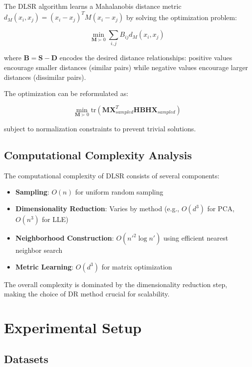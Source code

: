 \documentclass[review]{elsarticle}
\begin{document}
The DLSR algorithm learns a Mahalanobis distance metric $d_M(x_i, x_j) = (x_i - x_j)^T M (x_i - x_j)$ by solving the optimization problem:

\begin{equation}
\min_{\mathbf{M} \succ 0} \sum_{i,j} B_{ij} d_M(x_i, x_j)
\end{equation}

where $\mathbf{B} = \mathbf{S} - \mathbf{D}$ encodes the desired distance relationships: positive values encourage smaller distances (similar pairs) while negative values encourage larger distances (dissimilar pairs).

The optimization can be reformulated as:

\begin{equation}
\min_{\mathbf{M} \succ 0} \text{tr}(\mathbf{M} \mathbf{X}_{sampled}^T \mathbf{H} \mathbf{B} \mathbf{H} \mathbf{X}_{sampled})
\end{equation}

subject to normalization constraints to prevent trivial solutions.

\subsection{Computational Complexity Analysis}

The computational complexity of DLSR consists of several components:

\begin{itemize}
\item \textbf{Sampling}: $O(n)$ for uniform random sampling
\item \textbf{Dimensionality Reduction}: Varies by method (e.g., $O(d^3)$ for PCA, $O(n^3)$ for LLE)
\item \textbf{Neighborhood Construction}: $O(n'^2 \log n')$ using efficient nearest neighbor search
\item \textbf{Metric Learning}: $O(d^3)$ for matrix optimization
\end{itemize}

The overall complexity is dominated by the dimensionality reduction step, making the choice of DR method crucial for scalability.

\section{Experimental Setup}
\label{sec:experimental}

\subsection{Datasets}
\end{document}
